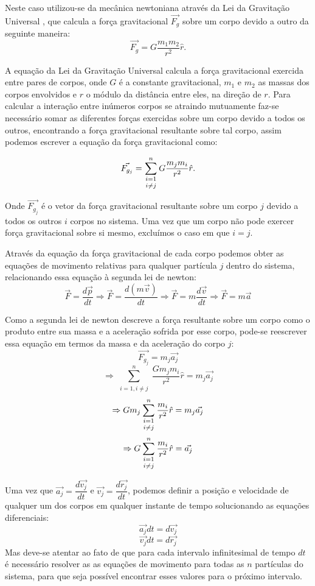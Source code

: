 \documentclass[
	12pt,				%
	a4paper,			%
	english,			%
	openright,				%
	brazil,				%
	oneside]{abntex2}
\begin{document}
	Neste caso utilizou-se da mecânica newtoniana através da Lei da Gravitação Universal \cite{halliday}, que calcula a força gravitacional $\vec{F_g}$ sobre um corpo devido a outro da seguinte maneira:\\
	\[\vec{F_g} = G\dfrac{m_1m_2}{r^2}\hat{r}.\]
	
	A equação da Lei da Gravitação Universal calcula a força gravitacional exercida entre pares de corpos, onde $G$ é a constante gravitacional, $m_1$ e $m_2$ as massas dos corpos envolvidos e $r$ o módulo da distância entre eles, na direção de $r$. Para calcular a interação entre inúmeros corpos se atraindo mutuamente faz-se necessário somar as diferentes forças exercidas sobre um corpo devido a todos os outros, encontrando a força gravitacional resultante sobre tal corpo, assim podemos escrever a equação da força gravitacional como:
	
	\[\vec{F_{g_j}} = \sum\limits_{\substack{i=1\atop i \neq j }}^{n} G\dfrac{m_j m_i}{r^2}\hat{r}. \]
	
	Onde $\vec{F_{g_j}}$ é o vetor da força gravitacional resultante sobre um corpo $j$ devido a todos os outros $i$ corpos no sistema. Uma vez que um corpo não pode exercer força gravitacional sobre si mesmo, excluímos o caso em que $i=j$.
	
	Através da equação da força gravitacional de cada corpo podemos obter as equações de movimento relativas para qualquer partícula $j$ dentro do sistema, relacionando essa equação à segunda lei de newton:
	\[\vec{F} = \dfrac{d\vec{p}}{dt} \Rightarrow \vec{F} = \dfrac{d (m\vec{v})}{dt} \Rightarrow  \vec{F} = m\dfrac{d\vec{v}}{dt} \Rightarrow \vec{F} = m\vec{a} \]
	
	Como a segunda lei de newton descreve a força resultante sobre um corpo como o produto entre sua massa e a aceleração sofrida por esse corpo, pode-se reescrever essa equação em termos da massa e da aceleração do corpo $j$:
	\[\vec{F_{g_j}} = m_j \vec{a_j} \]
	\[\Rightarrow \sum\limits_{\substack{i=1, i \neq j }}^{n} \dfrac{G m_j m_i}{r^2} \hat{r} = m_j \vec{a_j} \]
	\[\Rightarrow  G m_j  \sum\limits_{\substack{i=1\atop i \neq j }}^{n} \dfrac{m_i}{r^2} \hat{r} = m_j \vec{a_j} \]
	\[\Rightarrow  G\sum\limits_{\substack{i=1 \atop i \neq j }}^{n} \dfrac{m_i}{r^2}\hat{r} = \vec{a_j} \]
	
	Uma vez que $\vec{a_j} = \dfrac{d\vec{v_j}}{dt}$ e $\vec{v_j} = \dfrac{d\vec{r_j}}{dt}$, podemos definir a posição e velocidade de qualquer um dos corpos em qualquer instante de tempo solucionando as equações diferenciais:
	\[\vec{a_j}dt = d\vec{v_j}\]
	\[\vec{v_j}dt = d\vec{r_j}\]
	 Mas deve-se atentar ao fato de que para cada intervalo infinitesimal de tempo $dt$ é necessário resolver as as equações de movimento para todas as $n$ partículas do sistema, para que seja possível encontrar esses valores para o próximo intervalo.
	
\end{document}
